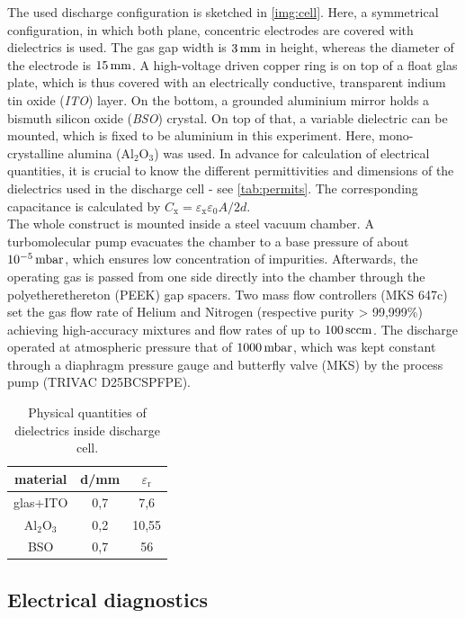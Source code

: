 \documentclass[a4paper,10pt,twoside]{article}
\newcommand{\tenpo}[1]{ 10^{#1}}
\newcommand{\ix}[1]{_\text{#1}}
\newcommand{\tilt}[1]{\textit{#1}}
\begin{document}
			The used discharge configuration is sketched in \autoref{img:cell}. Here, a symmetrical configuration, in which both plane, concentric electrodes are covered with dielectrics is used. The gas gap width is $\unit[3]{mm}$ in height, whereas the diameter of the electrode is $\unit[15]{mm}$. A high-voltage driven copper ring is on top of a float glas plate, which is thus covered with an electrically conductive, transparent indium tin oxide  (\tilt{ITO}) layer. On the bottom, a grounded aluminium mirror holds a bismuth silicon oxide (\tilt{BSO}) crystal. On top of that, a variable dielectric can be mounted, which is fixed to be aluminium in this experiment. Here, mono-crystalline alumina (Al$_2$O$_3$) was used. In advance for calculation of electrical quantities, it is crucial to know the different permittivities and dimensions of the dielectrics used in the discharge cell  - see \autoref{tab:permits}. The corresponding capacitance is calculated by $C\ix{x}=\varepsilon\ix{x}\varepsilon_0 A/2d$.\\
			The whole construct is mounted inside a steel vacuum chamber. A turbomolecular pump evacuates the chamber to a base pressure of about $\unit[\tenpo{-5}]{mbar}$, which ensures low concentration of impurities. Afterwards, the operating gas is passed from one side directly into the chamber through the polyetherethereton (PEEK) gap spacers. Two mass flow controllers (MKS 647c) set the gas flow rate of Helium and Nitrogen (respective purity > 99,999\%) achieving high-accuracy mixtures and flow rates of up to $\unit[100]{sccm}$. The discharge operated at atmospheric pressure that of $\unit[1000]{mbar}$, which was kept constant through a diaphragm pressure gauge and butterfly valve (MKS) by the process pump (TRIVAC D25BCSPFPE).
			

				\begin{table}[h]
					\centering
					\begin{tabular}{c|c|c}
						material & d/mm & $\varepsilon\ix{r}$ \\
						\hline \hline glas+ITO & 0,7 & 7,6 \\
						\hline Al$\ix{2}$O$\ix{3}$ & 0,2 & 10,55 \\
						\hline BSO & 0,7 & 56 \\
					\end{tabular}
					\caption{Physical quantities of dielectrics inside discharge cell.}
					\label{tab:permits}
				\end{table}

		\subsection{Electrical diagnostics}\label{subsec:electric}
		
\end{document}
